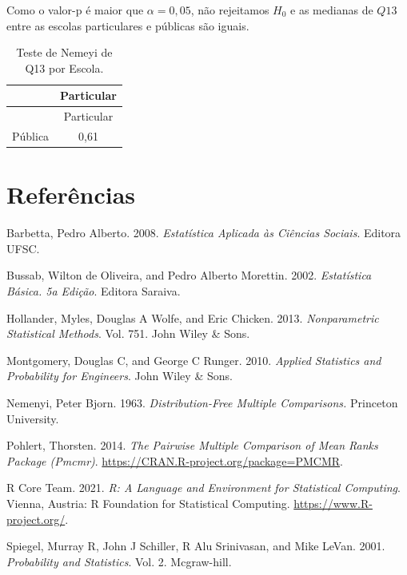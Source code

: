 \documentclass[]{article}
\begin{document}
Como o valor-p é maior que \(\alpha=0,05\), não rejeitamos \(H_0\) e as medianas de \(Q13\) entre as escolas particulares e públicas são iguais.

\begin{longtable}[]{@{}lc@{}}
\caption{\label{tab:unnamed-chunk-89}Teste de Nemeyi de Q13 por Escola.}\tabularnewline
\toprule
& Particular\tabularnewline
\midrule
\endfirsthead
\toprule
& Particular\tabularnewline
\midrule
\endhead
Pública & 0,61\tabularnewline
\bottomrule
\end{longtable}

\cleardoublepage

\hypertarget{referuxeancias}{%
\section*{Referências}\label{referuxeancias}}

\hypertarget{refs}{}
\leavevmode\hypertarget{ref-barbetta2008estatistica}{}%
Barbetta, Pedro Alberto. 2008. \emph{Estatística Aplicada às Ciências Sociais}. Editora UFSC.

\leavevmode\hypertarget{ref-bussab2002estatistica}{}%
Bussab, Wilton de Oliveira, and Pedro Alberto Morettin. 2002. \emph{Estatística Básica. 5a Edição}. Editora Saraiva.

\leavevmode\hypertarget{ref-hollander2013nonparametric}{}%
Hollander, Myles, Douglas A Wolfe, and Eric Chicken. 2013. \emph{Nonparametric Statistical Methods}. Vol. 751. John Wiley \& Sons.

\leavevmode\hypertarget{ref-montgomery2010applied}{}%
Montgomery, Douglas C, and George C Runger. 2010. \emph{Applied Statistics and Probability for Engineers}. John Wiley \& Sons.

\leavevmode\hypertarget{ref-nemenyi1963distribution}{}%
Nemenyi, Peter Bjorn. 1963. \emph{Distribution-Free Multiple Comparisons.} Princeton University.

\leavevmode\hypertarget{ref-PMCMR}{}%
Pohlert, Thorsten. 2014. \emph{The Pairwise Multiple Comparison of Mean Ranks Package (Pmcmr)}. \url{https://CRAN.R-project.org/package=PMCMR}.

\leavevmode\hypertarget{ref-Rlang}{}%
R Core Team. 2021. \emph{R: A Language and Environment for Statistical Computing}. Vienna, Austria: R Foundation for Statistical Computing. \url{https://www.R-project.org/}.

\leavevmode\hypertarget{ref-spiegel2001probability}{}%
Spiegel, Murray R, John J Schiller, R Alu Srinivasan, and Mike LeVan. 2001. \emph{Probability and Statistics}. Vol. 2. Mcgraw-hill.
\end{document}
